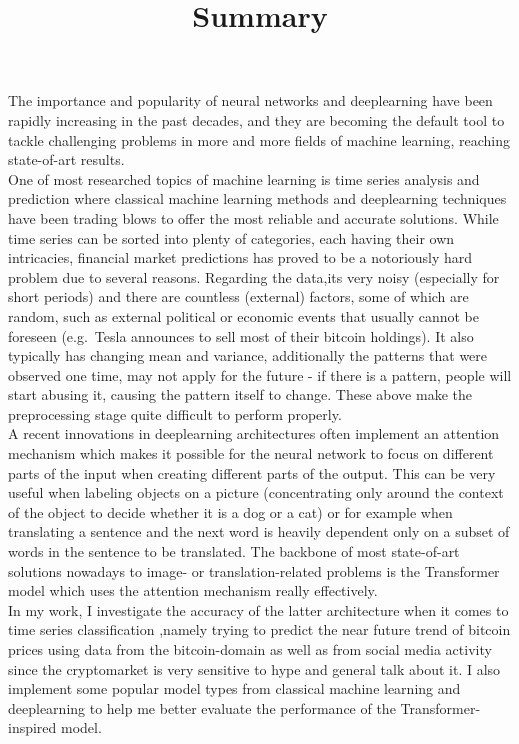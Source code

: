 \documentclass[12pt]{article}
\title{\vspace{-2.0cm}Summary}
\begin{document}
    \date{\vspace{-5ex}}
    \maketitle
    The importance and popularity of neural networks and deeplearning have been rapidly increasing in the past decades,
    and they are becoming the default tool to tackle challenging problems in more and more fields of machine
    learning, reaching state-of-art results.\\
    \indent One of most researched topics of machine learning is time series analysis and prediction where
    classical machine learning methods and deeplearning techniques have been trading blows to offer the most reliable
    and accurate solutions.
    While time series can be sorted into plenty of categories, each having their own intricacies,
    financial market predictions has proved to be a notoriously hard problem due to several reasons.
    Regarding the data,its very noisy (especially for short periods) and there are countless (external) factors,
    some of which are random, such as external political or economic events that usually cannot be foreseen (e.g.\
    Tesla announces to sell most of their bitcoin holdings).
    It also typically has changing mean and variance, additionally the patterns that were observed one time,
    may not apply for the future - if there is a pattern, people will start abusing it, causing the pattern itself to change.
    These above make the preprocessing stage quite difficult to perform properly.\\
    \indent A recent innovations in deeplearning architectures often implement an attention mechanism which makes
    it possible for the neural network to focus on different parts of the input when creating different parts of the output.
    This can be very useful when labeling objects on a picture (concentrating only around the context of the object to decide
    whether it is a dog or a cat) or for example when translating a sentence and the next word is heavily dependent only
    on a subset of words in the sentence to be translated.
    The backbone of most state-of-art solutions nowadays to image- or translation-related problems is
    the Transformer model which uses the attention mechanism really effectively.\\
    \indent In my work, I investigate the accuracy of the latter architecture when it comes to time series classification
    ,namely trying to predict the near future trend of bitcoin prices using data from the bitcoin-domain as well as
    from social media activity since the cryptomarket is very sensitive to hype and general talk about it.
    I also implement some popular model types from classical machine learning and deeplearning to help me better evaluate
    the performance of the Transformer-inspired model.
\end{document}
